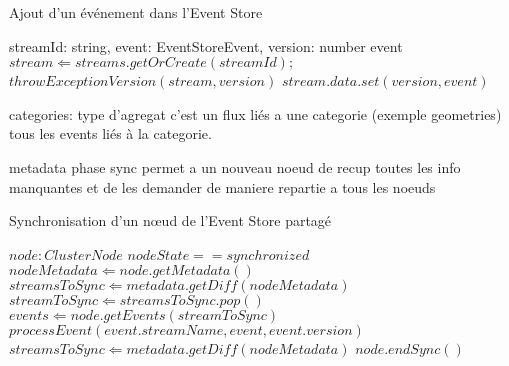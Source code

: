 \begin{algorithm} %
	\caption{Ajout d'un événement dans l'Event Store} %
	\label{algo:addevent} %
	\begin{algorithmic} %
		\REQUIRE streamId: string, event: EventStoreEvent, version: number
		\ENSURE event
		\STATE $stream \Leftarrow streams.getOrCreate(streamId);$
		\STATE $throwExceptionVersion(stream,version)$
		\ENDIF
		\STATE $stream.data.set(version,event) $
	\end{algorithmic}
\end{algorithm}

categories: type d’agregat
c’est un flux liés a une categorie (exemple geometries) tous les events liés à la 
categorie.

metadata phase sync permet a un nouveau noeud de recup toutes les info 
manquantes et de les demander de maniere repartie a tous les noeuds


\begin{algorithm} %
	\caption{Synchronisation d'un n\oe ud de l'Event Store partagé} %
	\label{algo:synchnode} %
	\begin{algorithmic} %
		\REQUIRE $node : ClusterNode$
		\ENSURE $nodeState == synchronized$
		\STATE $nodeMetadata \Leftarrow node.getMetadata()$
			\STATE $streamsToSync \Leftarrow metadata.getDiff(nodeMetadata)$
				\STATE $streamToSync \Leftarrow streamsToSync.pop()$
				\STATE $events \Leftarrow  node.getEvents(streamToSync)$
						\STATE $processEvent(event.streamName, event, 
						event.version)$
					\ENDFOR 
				\ENDIF
				\STATE $streamsToSync \Leftarrow metadata.getDiff(nodeMetadata)$
			\ENDWHILE
		\ENDIF
		\STATE $node.endSync()$
	\end{algorithmic}
\end{algorithm}


